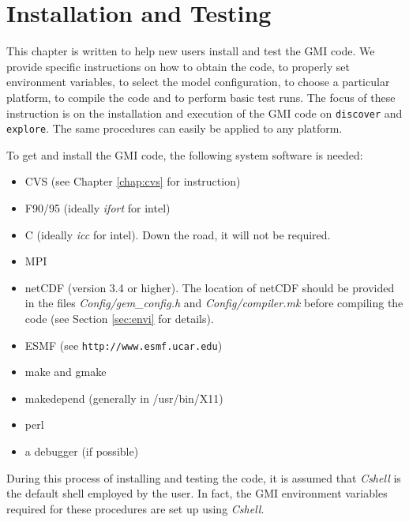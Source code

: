 %
\chapter[Installation and Testing]{Installation and Testing}
\label{chap:installation}
%
This chapter is written to help new users install and 
test the GMI code. 
We provide specific instructions on how to obtain the code, 
to properly set environment variables, to select the model 
configuration, to choose a particular platform, 
to compile the code and to perform basic test runs. 
The focus of these instruction is on the installation and execution of 
the GMI code on {\tt discover} and {\tt explore}. 
The same procedures can easily be applied to any platform.

To get and install the GMI code, the following system software is needed:
%
\begin{itemize}
\item CVS (see Chapter \ref{chap:cvs} for instruction)
\item F90/95 (ideally {\em ifort} for intel)
\item C (ideally {\em icc} for intel). Down the road, it will not be required.
\item MPI 
\item netCDF (version 3.4 or higher). The location of netCDF should be
      provided in the files {\em Config/gem\_config.h} and {\em Config/compiler.mk}
      before compiling the code (see Section \ref{sec:envi} for details).
\item ESMF (see {\tt http://www.esmf.ucar.edu}) 
\item make and gmake
\item makedepend (generally in /usr/bin/X11)
\item perl
\item a debugger (if possible)
\end{itemize}


%
During this process of installing and testing the code, it is 
assumed that {\em Cshell} is the default shell employed by the user.
In fact, the GMI environment variables required for these procedures are
set up using {\em Cshell}.

